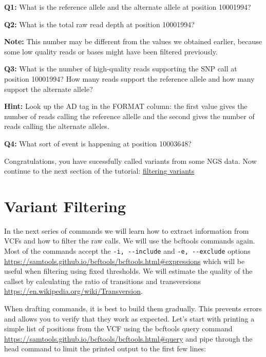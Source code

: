 \documentclass[11pt]{article}
\begin{document}
    \textbf{Q1:} What is the reference allele and the alternate allele at
position 10001994?

\textbf{Q2:} What is the total raw read depth at position 10001994?

\textbf{Note:} This number may be different from the values we obtained
earlier, because some low quality reads or bases might have been
filtered previously.

\textbf{Q3:} What is the number of high-quality reads supporting the SNP
call at position 10001994? How many reads support the reference allele
and how many support the alternate allele?

\textbf{Hint:} Look up the AD tag in the FORMAT column: the first value
gives the number of reads calling the reference allelle and the second
gives the number of reads calling the alternate alleles.

\textbf{Q4:} What sort of event is happening at position 10003648?

    Congratulations, you have sucessfully called variants from some NGS
data. Now continue to the next section of the tutorial:
\href{filtering.ipynb}{filtering variants}





\newpage





    \hypertarget{variant-filtering}{%
\section{Variant Filtering}\label{variant-filtering}}

    In the next series of commands we will learn how to extract information
from VCFs and how to filter the raw calls. We will use the bcftools
commands again. Most of the commands accept the
\texttt{-i,\ -\/-include} and \texttt{-e,\ -\/-exclude} options
\url{https://samtools.github.io/bcftools/bcftools.html\#expressions}
which will be useful when filtering using fixed thresholds. We will
estimate the quality of the callset by calculating the ratio of
transitions and transversions
\url{https://en.wikipedia.org/wiki/Transversion}.

When drafting commands, it is best to build them gradually. This
prevents errors and allows you to verify that they work as expected.
Let's start with printing a simple list of positions from the VCF using
the bcftools query command
\url{https://samtools.github.io/bcftools/bcftools.html\#query} and pipe
through the head command to limit the printed output to the first few
lines:
\end{document}
